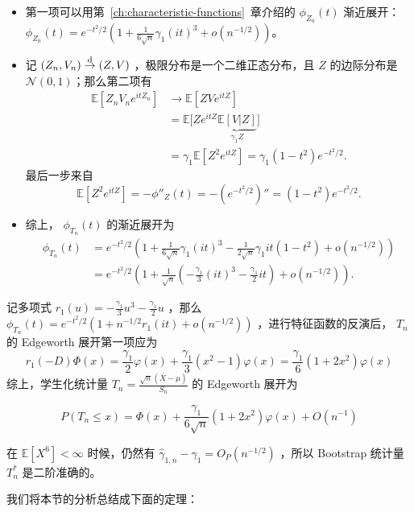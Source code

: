 \begin{itemize}
\tightlist
\item
  第一项可以用第~\ref{ch:characteristic-functions}~章介绍的 $\phi_{Z_n}(t)$ 渐近展开：$\phi_{Z_n}(t)=e^{-t^2/2}\left(1+\frac{1}{6\sqrt n}\gamma_1(it)^3+o(n^{-1/2})\right)$。
\item
  记 $(Z_n,V_n)\overset{\rm d}\to (Z,V)$ ，极限分布是一个二维正态分布，且 $Z$ 的边际分布是 $\mathcal N(0,1)$；那么第二项有
  \[
  \begin{aligned}
  \mathbb E[Z_nV_n e^{itZ_n}]
  &\to \mathbb E[ZV e^{itZ}]\\
  &=\mathbb E\Big[Ze^{itZ}\underbrace{\mathbb E[V|Z]}_{\gamma_1Z}\Big]\\
  &=\gamma_1\mathbb E[Z^2e^{itZ}]
  =\gamma_1(1-t^2)e^{-t^2/2}.
  \end{aligned}
  \]
  最后一步来自
  \[
  \mathbb E[Z^2e^{itZ}]
  =-\phi''_Z(t)=-(e^{-t^2/2})''=(1-t^2)e^{-t^2/2}.
  \]
\item
  综上， $\phi_{T_n}(t)$ 的渐近展开为
  \[  \begin{aligned} \phi_{T_n}(t)&=e^{-t^2/2}\left(1+\frac{1}{6\sqrt n}\gamma_1(it)^3-\frac1{2\sqrt n}\gamma_1 it(1-t^2)+o(n^{-1/2})\right)\\ &=e^{-t^2/2}\left(1+\frac{1}{\sqrt n}\left(-\frac{\gamma_1}{3}(it)^3-\frac{\gamma_1}2it\right)+o(n^{-1/2})\right). \end{aligned}
  \]\end{itemize}

记多项式 $r_1(u)=-\tfrac{\gamma_1}{3}u^3-\tfrac {\gamma_1}2 u$ ，那么 $\phi_{T_n}(t)=e^{-t^2/2}(1+n^{-1/2}r_1(it)+o(n^{-1/2}))$ ，进行特征函数的反演后， $T_n$ 的 Edgeworth 展开第一项应为
\[r_1(-D)\Phi(x)=\frac{\gamma_1}{2}\varphi(x)+\frac{\gamma_1}{3}(x^2-1)\varphi(x)  =\frac{\gamma_1}{6}(1+2x^2)\varphi(x)\]
综上，学生化统计量 $T_n=\frac{\sqrt n(\bar X-\mu)}{S_n}$ 的 Edgeworth 展开为

\begin{equation}
\label{eq:ch11a:tag-3}
P(T_n\leq x) = \Phi(x) +\frac{\gamma_1}{6\sqrt{n}}(1+2x^2)\varphi(x) +O(n^{-1})
\end{equation}

在 $\mathbb E[X^6]<\infty$ 时候，仍然有 $\widehat\gamma_{1,n}-\gamma_1=O_P(n^{-1/2})$ ，所以 Bootstrap 统计量 $T_n^*$ 是二阶准确的。

我们将本节的分析总结成下面的定理：

